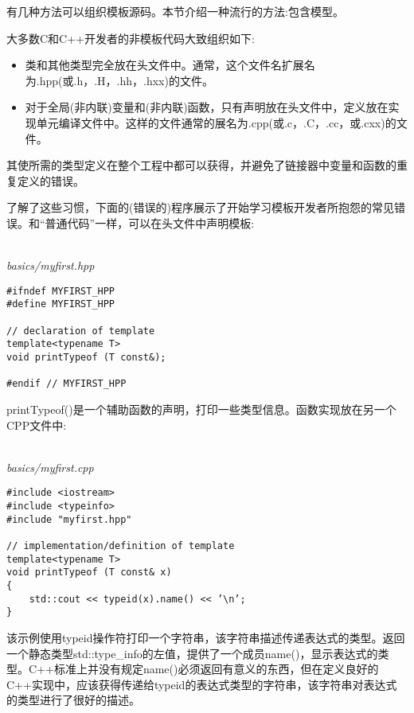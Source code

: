 

有几种方法可以组织模板源码。本节介绍一种流行的方法:包含模型。


大多数C和C++开发者的非模板代码大致组织如下:

\begin{itemize}
\item
类和其他类型完全放在头文件中。通常，这个文件名扩展名为.hpp(或.h，.H，.hh，.hxx)的文件。

\item
对于全局(非内联)变量和(非内联)函数，只有声明放在头文件中，定义放在实现单元编译文件中。这样的文件通常的展名为.cpp(或.c，.C，.cc，或.cxx)的文件。
\end{itemize}

其使所需的类型定义在整个工程中都可以获得，并避免了链接器中变量和函数的重复定义的错误。

了解了这些习惯，下面的(错误的)程序展示了开始学习模板开发者所抱怨的常见错误。和“普通代码”一样，可以在头文件中声明模板:

\hspace*{\fill} \\ %
\noindent
\textit{basics/myfirst.hpp}
\begin{lstlisting}[style=styleCXX]
#ifndef MYFIRST_HPP
#define MYFIRST_HPP

// declaration of template
template<typename T>
void printTypeof (T const&);

#endif // MYFIRST_HPP
\end{lstlisting}

printTypeof()是一个辅助函数的声明，打印一些类型信息。函数实现放在另一个CPP文件中:

\hspace*{\fill} \\ %
\noindent
\textit{basics/myfirst.cpp}
\begin{lstlisting}[style=styleCXX]
#include <iostream>
#include <typeinfo>
#include "myfirst.hpp"

// implementation/definition of template
template<typename T>
void printTypeof (T const& x)
{
	std::cout << typeid(x).name() << ’\n’;
}
\end{lstlisting}

该示例使用typeid操作符打印一个字符串，该字符串描述传递表达式的类型。返回一个静态类型std::type\_info的左值，提供了一个成员name()，显示表达式的类型。C++标准上并没有规定name()必须返回有意义的东西，但在定义良好的C++实现中，应该获得传递给typeid的表达式类型的字符串，该字符串对表达式的类型进行了很好的描述。
 
